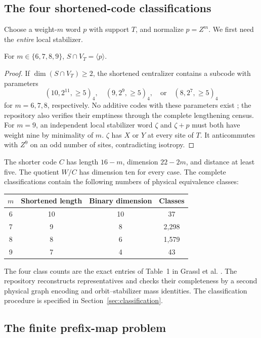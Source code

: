 \subsection{The four shortened-code classifications}

Choose a weight-\(m\) word \(p\) with support \(T\), and normalize
\(p=Z^m\). We first need the \emph{entire} local stabilizer.

\begin{lemma}\label{lem:16-rankone}
For \(m\in\{6,7,8,9\}\), \(S\cap V_T=\langle p\rangle\).
\end{lemma}
\begin{proof}
If \(\dim(S\cap V_T)\geq2\), the shortened centralizer contains a
subcode with parameters
\[
 (10,2^{11},\geq5)_4,\quad(9,2^9,\geq5)_4,
       \quad\text{or}\quad(8,2^7,\geq5)_4
\]
for \(m=6,7,8\), respectively. No additive codes with these parameters exist
\cite{dodeca}; the repository also verifies their emptiness through the
complete lengthening census.
For \(m=9\), an independent local stabilizer word \(\zeta\) and \(\zeta+p\)
must both have weight nine by minimality of \(m\). \(\zeta\) has
\(X\) or \(Y\) at every site of \(T\). It anticommutes with
\(Z^9\) on an odd number of sites, contradicting isotropy.
\end{proof}

The shorter code \(C\) has length \(16-m\), dimension
\(22-2m\), and distance at least five. The quotient \(W/C\) has
dimension ten for every case. The complete classifications contain the following
numbers of physical equivalence classes:
\begin{center}
\begin{tabular}{@{}cccc@{}}\toprule
\(m\)&Shortened length&Binary dimension&Classes\\\midrule
6&10&10&37\\7&9&8&2,298\\8&8&6&1,579\\9&7&4&43\\\bottomrule
\end{tabular}
\end{center}
The four class counts are the exact entries of Table~1 in
Grassl et al. \cite{dodeca}.
The repository reconstructs representatives and checks their completeness
by a second physical graph encoding and orbit--stabilizer mass identities.
The classification procedure is specified in Section~\ref{sec:classification}.

\subsection{The finite prefix-map problem}

